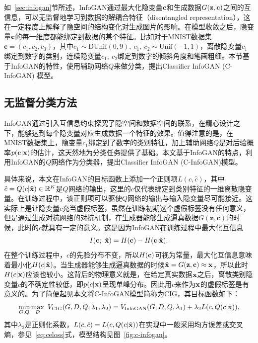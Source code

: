 如~\ref{sec:infogan}节所述，InfoGAN通过最大化隐变量$\mathbf{c}$和生成数据$G(\mathbf{z}, \mathbf{c})$之间的互信息，可以无监督地学习到数据的解耦合特征（disentangled representation），这在一定程度上解释了隐空间的结构变化对生成图片的影响。在模型收敛之后，隐变量$\mathbf{c}$的每一维度都能绑定到数据的某个特征。比如对于MNIST数据集$\mathbf{c} = (c_1, c_2, c_3)$，其中$c_1 \sim \text{DUnif}(0,9), ~c_1,~c_2 \sim \text{Unif}(-1,1)$，离散隐变量$c_1$绑定到数字的类别，连续隐变量$c_1, ~c_2$绑定到数字的倾斜角度和笔画粗细。本节基于InfoGAN的特性，使用辅助网络$Q$来做分类，提出Classifier InfoGAN (C-InfoGAN) 模型。

\subsection{无监督分类方法}
InfoGAN通过引入互信息约束探究了隐空间和数据空间的联系，在精心设计之下，能够达到每个隐变量对应生成数据一个特征的效果。值得注意的是，在MNIST数据集上，隐变量$c_1$绑定到了数字的类别特征，加上辅助网络$Q$是对后验概率$p(\mathbf{c}|\mathbf{x})$的估计，这天然地为分类任务提供了基础。本文基于InfoGAN的特点，利用InfoGAN的$Q$网络作为分类器，提出Classifier InfoGAN (C-InfoGAN)模型。

具体来说，本文在InfoGAN的目标函数上添加一个正则项$L(c,\hat{c})$，其中$\hat{c} = Q(c|\tilde{\mathbf{x}}) \in \mathbb{R}^K$是$Q$网络的输出，这里的$c$仅代表绑定到类别特征的一维离散隐变量。在训练过程中，该正则项可以驱使$Q$网络的输出与输入隐变量尽可能接近。这实际上是让隐变量$c$充当虚假标签，虽然在训练初期这个虚假标签没有任何意义，但是通过生成对抗网络的对抗机制，在生成器能够生成逼真数据$G(\mathbf{z}, \mathbf{c})$的时候，此时的$c$就具有一定的意义。这是因为InfoGAN在训练过程中最大化互信息
\[
  I(\mathbf{c};~\tilde{\mathbf{x}}) = 
    H(\mathbf{c}) - H(\mathbf{c}|\tilde{\mathbf{x}}).
\]
在整个训练过程中，$c$的先验分布不变，所以$H(\mathbf{c})$可视为常量，最大化互信息意味着最小化$H(c|\tilde{\mathbf{x}})$。当生成器能够生成逼真数据的时候$\tilde{\mathbf{x}} = G(\mathbf{z},\mathbf{c}) \approx \mathbf{x}$，所以此时$H(c|\mathbf{x})$应该也较小。这背后的物理意义就是，在给定真实数据$\mathbf{x}$之后，离散类别隐变量$c$的不确定性较低，即$p(c|\mathbf{x})$呈现单峰分布。因此用$c$来作为$\mathbf{x}$的虚假标签是有意义的。为了简便起见本文将C-InfoGAN模型简称为CIG，其目标函数如下：
\begin{equation}
    \min_{G,Q}\max_D~ V_{\text{CIG}}(G,D,Q,\lambda_1,\lambda_2) = 
    V_{\text{InfoGAN}}(G,D,Q,\lambda_1) + \lambda_2 L(c, Q(c|\tilde{\mathbf{x}})),
\end{equation}
其中$\lambda_2$是正则化系数，$L(c,\hat{c}) = L(c, Q(c|\tilde{\mathbf{x}}))$在实现中一般采用均方误差或交叉熵，参见~\eqref{eq:celoss}式，模型结构见图~\ref{fig:c-infogan}。

